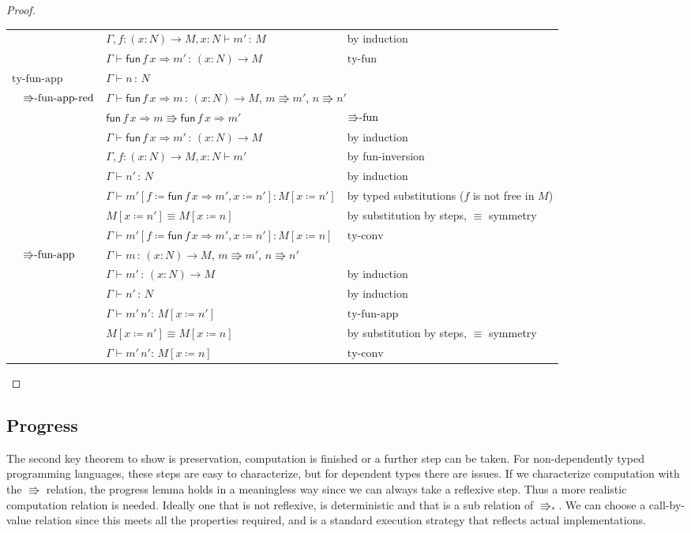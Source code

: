 \begin{proof}
\begin{tabular}{llll}
 &  & $\Gamma,f:\left(x:N\right)\rightarrow M,x:N\vdash m'\,:\,M$ & by induction \tabularnewline
 &  & $\Gamma\vdash\mathsf{fun}\,f\,x\Rightarrow m'\,:\,\left(x:N\right)\rightarrow M$ & $\textrm{ty-fun}$\tabularnewline
\multicolumn{2}{l}{$\textrm{ty-fun-app}$} & $\Gamma\vdash n\,:\,N$ & \tabularnewline
 & $\textrm{\ensuremath{\Rrightarrow}-fun-app-red}$ & \multicolumn{2}{l}{$\Gamma\vdash\mathsf{fun}\,f\,x\Rightarrow m\,:\,\left(x:N\right)\rightarrow M$,
$m\Rrightarrow m'$, $n\Rrightarrow n'$}\tabularnewline
 &  & $\mathsf{fun}\,f\,x\Rightarrow m\Rrightarrow\mathsf{fun}\,f\,x\Rightarrow m'$ & $\textrm{\ensuremath{\Rrightarrow}-fun}$\tabularnewline
 &  & $\Gamma\vdash\mathsf{fun}\,f\,x\Rightarrow m'\,:\,\left(x:N\right)\rightarrow M$ & by induction\tabularnewline
 &  & $\Gamma,f:\left(x:N\right)\rightarrow M,x:N\vdash m'$ & by fun-inversion\tabularnewline
 &  & $\Gamma\vdash n'\,:\,N$ & by induction\tabularnewline
 &  & $\Gamma\vdash m'\left[f\coloneqq\mathsf{fun}\,f\,x\Rightarrow m',x\coloneqq n'\right]:M\left[x\coloneqq n'\right]$ & by typed substitutions ($f$ is not free in $M$)\tabularnewline
 &  & $M\left[x\coloneqq n'\right]\equiv M\left[x\coloneqq n\right]$ & by substitution by steps, $\equiv$ symmetry\tabularnewline
 &  & $\Gamma\vdash m'\left[f\coloneqq\mathsf{fun}\,f\,x\Rightarrow m',x\coloneqq n'\right]:M\left[x\coloneqq n\right]$ & $\textrm{ty-conv}$\tabularnewline
 & $\textrm{\ensuremath{\Rrightarrow}-fun-app}$ & $\Gamma\vdash m\,:\,\left(x:N\right)\rightarrow M$, $m\Rrightarrow m'$,
$n\Rrightarrow n'$ & \tabularnewline
 &  & $\Gamma\vdash m'\,:\,\left(x:N\right)\rightarrow M$ & by induction\tabularnewline
 &  & $\Gamma\vdash n'\,:\,N$ & by induction\tabularnewline
 &  & $\Gamma\vdash m'\,n':\,M\left[x\coloneqq n'\right]$ & $\textrm{ty-fun-app}$\tabularnewline
 &  & $M\left[x\coloneqq n'\right]\equiv M\left[x\coloneqq n\right]$ & by substitution by steps, $\equiv$ symmetry\tabularnewline
 &  & $\Gamma\vdash m'\,n':\,M\left[x\coloneqq n\right]$ & $\textrm{ty-conv}$\tabularnewline
\end{tabular}
\end{proof}

\subsection{Progress}

The second key theorem to show is preservation, computation is finished or a further step can be taken.
For non-dependently typed programming languages, these steps are easy to characterize, but for dependent types there are issues.
If we characterize computation with the $\Rrightarrow$ relation, the progress lemma holds in a meaningless way since we can always take a reflexive step.
Thus a more realistic computation relation is needed.
Ideally one that is not reflexive, is deterministic and that is a sub relation of $\Rrightarrow_{*}$.
We can choose a call-by-value relation since this meets all the properties required, and is a standard execution strategy that reflects actual implementations.

